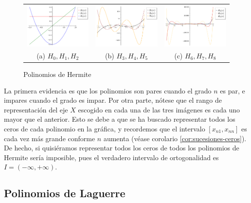 \begin{figure}[h]
    \centering
    \begin{tabular}{ccc}
        \includegraphics[width=5cm]{img/C2/Hermite1.png} & 
        \includegraphics[width=5cm]{img/C2/Hermite2.png} &
        \includegraphics[width=5cm]{img/C2/Hermite3.png} \\
        (a) $H_0, H_1, H_2$ & (b) $H_3, H_4, H_5$ & (c) $H_6, H_7, H_8$ 
    \end{tabular}
    \caption{Polinomios de Hermite}
    \label{img:graficas-Hermite}
\end{figure}

La primera evidencia es que los polinomios son pares cuando el grado $n$ es par, e impares cuando el grado es impar. Por otra parte, nótese que el rango de representación del eje $X$ escogido en cada una de las tres imágenes es cada uno mayor que el anterior. Esto se debe a que se ha buscado representar todos los ceros de cada polinomio en la gráfica, y recordemos que el intervalo $[x_{n1},x_{nn}]$ es cada vez más grande conforme $n$ aumenta (véase corolario \ref{cor:sucesiones-ceros}). De hecho, si quisiéramos representar todos los ceros de todos los polinomios de Hermite sería imposible, pues el verdadero intervalo de ortogonalidad es $I=(-\infty,+\infty)$.

\subsection{Polinomios de Laguerre}
\label{subsec:Laguerre}

